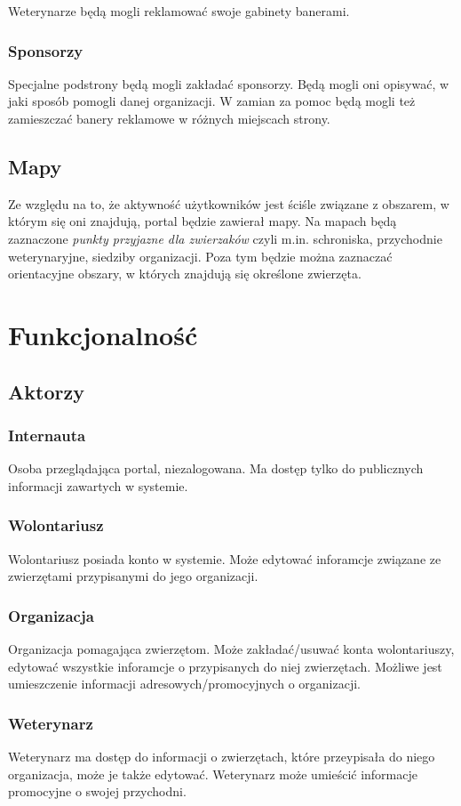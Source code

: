 \documentclass[10pt,a4paper]{article}
\begin{document}
Weterynarze będą mogli reklamować swoje gabinety banerami.

\subsubsection{Sponsorzy}
Specjalne podstrony będą mogli zakładać sponsorzy. Będą mogli oni opisywać, w jaki sposób pomogli danej organizacji. W zamian za pomoc będą mogli też zamieszczać banery reklamowe w różnych miejscach strony.
 
\subsection{Mapy}
Ze względu na to, że aktywność użytkowników jest ściśle związane z obszarem, w którym się oni znajdują, portal będzie zawierał mapy. Na mapach będą zaznaczone \emph{punkty przyjazne dla zwierzaków} czyli m.in. schroniska, przychodnie weterynaryjne, siedziby organizacji. Poza tym będzie można zaznaczać orientacyjne obszary, w których znajdują się określone zwierzęta.

\section{Funkcjonalność}
\subsection{Aktorzy}
\subsubsection{Internauta}
Osoba przeglądająca portal, niezalogowana. Ma dostęp tylko do publicznych informacji zawartych w systemie.
\subsubsection{Wolontariusz}
Wolontariusz posiada konto w systemie. Może edytować inforamcje związane ze zwierzętami przypisanymi do jego organizacji.
\subsubsection{Organizacja}
Organizacja pomagająca zwierzętom. Może zakładać/usuwać konta wolontariuszy, edytować wszystkie inforamcje o przypisanych do niej zwierzętach. Możliwe jest umieszczenie informacji adresowych/promocyjnych o organizacji.
\subsubsection{Weterynarz}
Weterynarz ma dostęp do informacji o zwierzętach, które przeypisała do niego organizacja, może je także edytować. Weterynarz może umieścić informacje promocyjne o swojej przychodni.
\end{document}
